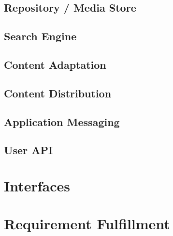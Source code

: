 \subsection{Repository / Media Store \label{sec:des_repo}}


\subsection{Search Engine\label{sec:des_se_en}}
\subsection{Content Adaptation\label{sec:des_ar_ov}}
\subsection{Content Distribution\label{sec:des_cdn}}	
	
	\subsection{Application Messaging\label{sec:des_me}}
	
	\subsection{User API\label{sec:des_api}}

\section{Interfaces\label{sec:des_inter}}

\section{Requirement Fulfillment\label{sec:des_inter}}